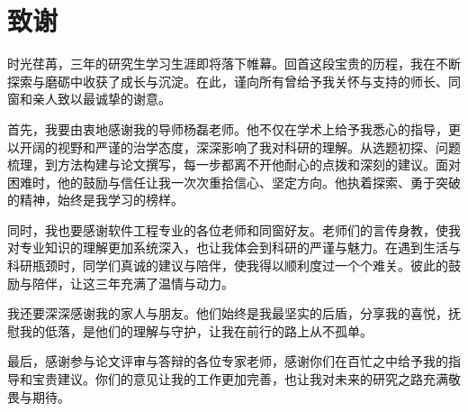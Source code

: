 \chapter{致\texorpdfstring{\quad}{}谢}
时光荏苒，三年的研究生学习生涯即将落下帷幕。回首这段宝贵的历程，我在不断探索与磨砺中收获了成长与沉淀。在此，谨向所有曾给予我关怀与支持的师长、同窗和亲人致以最诚挚的谢意。

首先，我要由衷地感谢我的导师杨磊老师。他不仅在学术上给予我悉心的指导，更以开阔的视野和严谨的治学态度，深深影响了我对科研的理解。从选题初探、问题梳理，到方法构建与论文撰写，每一步都离不开他耐心的点拨和深刻的建议。面对困难时，他的鼓励与信任让我一次次重拾信心、坚定方向。他执着探索、勇于突破的精神，始终是我学习的榜样。

同时，我也要感谢软件工程专业的各位老师和同窗好友。老师们的言传身教，使我对专业知识的理解更加系统深入，也让我体会到科研的严谨与魅力。在遇到生活与科研瓶颈时，同学们真诚的建议与陪伴，使我得以顺利度过一个个难关。彼此的鼓励与陪伴，让这三年充满了温情与动力。

我还要深深感谢我的家人与朋友。他们始终是我最坚实的后盾，分享我的喜悦，抚慰我的低落，是他们的理解与守护，让我在前行的路上从不孤单。

最后，感谢参与论文评审与答辩的各位专家老师，感谢你们在百忙之中给予我的指导和宝贵建议。你们的意见让我的工作更加完善，也让我对未来的研究之路充满敬畏与期待。